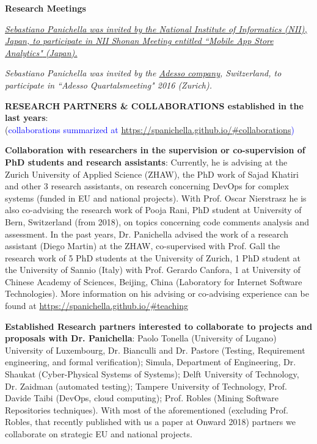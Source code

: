 \documentclass[12pt]{article}
\begin{document}
\textbf{Research Meetings}
\begin{innerlist}
   \item \emph{
              \href{http://www.nii.ac.jp/��}
                   {Sebastiano Panichella was invited by the \href{http://www.nii.ac.jp/}{National Institute of Informatics} (NII), Japan, to participate in \href{http://shonan.nii.ac.jp/shonan/}{NII Shonan Meeting entitled ``Mobile App Store Analytics"} (Japan).
}}

\item  \emph{Sebastiano Panichella was invited by the \href{http://www.adesso.de/de/}{Adesso company}, Switzerland, to participate in \textit{``Adesso Quartalsmeeting" 2016} (Zurich).}

\end{innerlist}
\vspace{8.5mm}


\textbf{RESEARCH PARTNERS \& COLLABORATIONS established in the last years}:\\
(\textcolor{blue}{collaborations summarized at \href{https://spanichella.github.io/\#collaborations}{https://spanichella.github.io/\#collaborations})}

\textbf{Collaboration with researchers in the supervision or co-supervision of PhD students and research assistants}:
 Currently, he is advising at the Zurich University of Applied Science (ZHAW), the PhD  work of Sajad Khatiri and other 3 research assistants, on research concerning DevOps for complex systems (funded in EU and national projects).
 With Prof. Oscar Nierstrasz he is also co-advising the research work of Pooja Rani, PhD student at University of Bern, Switzerland (from 2018), on topics concerning code comments analysis and assessment. In the past years, Dr. Panichella advised the work of a research assistant (Diego Martin) at the ZHAW, co-supervised with Prof. Gall the research work of 5 PhD students at the University of Zurich, 1 PhD student at the University of Sannio (Italy) with Prof. Gerardo Canfora, 1 at University of Chinese Academy of Sciences, Beijing, China (Laboratory for Internet Software Technologies).
 More information on his advising or co-advising experience can be found at \href{https://spanichella.github.io/\#teaching}{https://spanichella.github.io/\#teaching}

\textbf{Established Research partners interested to collaborate to projects and proposals with Dr. Panichella}: Paolo Tonella (University of Lugano)
 University of Luxembourg, Dr. Bianculli and Dr. Pastore (Testing, Requirement engineering, and formal verification); Simula, Department of Engineering, Dr. Shaukat (Cyber-Physical Systems of Systems);  Delft University of Technology,
Dr. Zaidman (automated testing); Tampere University of Technology, Prof. Davide Taibi (DevOps, cloud computing); Prof.
Robles (Mining Software Repositories techniques). With most of the aforementioned (excluding Prof. Robles, that recently published
with us a paper at Onward 2018) partners we collaborate on strategic EU and national projects. 
\end{document}
